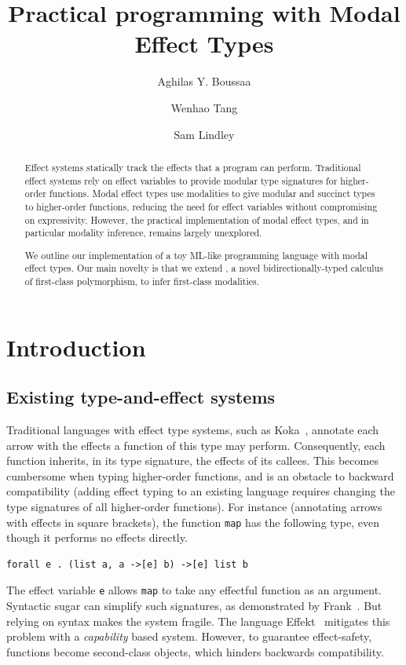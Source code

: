 \documentclass[sigplan, nonacm, natbib = false, review, screen]{acmart}
\title{Practical programming with Modal Effect Types}
\author{Aghilas Y. Boussaa}
\affiliation{
  \institution{École normale supérieure -- PSL}
  \country{France}
}
\author{Wenhao Tang}
\affiliation{%
  \institution{The University of Edinburgh}
  \country{UK}
}
\author{Sam Lindley}
\affiliation{%
  \institution{The University of Edinburgh}
  \country{UK}
}
\newcommand{\Frost}{\text{Frost}\xspace}
\begin{document}
\sloppy
\begin{abstract}
  Effect systems statically track the effects that a program can perform.
%
  Traditional effect systems rely on effect variables to provide modular type
  signatures for higher-order functions.
%
  Modal effect types use modalities to give modular and succinct types to
  higher-order functions, reducing the need for effect variables without
  compromising on expressivity.
%
  However, the practical implementation of modal effect types, and in particular
  modality inference, remains largely unexplored.

  We outline our implementation of a toy ML-like programming language with modal
  effect types.
%
  Our main novelty is that we extend \Frost, a novel bidirectionally-typed
  calculus of first-class polymorphism, to infer first-class modalities.
\end{abstract}
\maketitle
\section{Introduction}
\subsection{Existing type-and-effect systems}
Traditional languages with effect type systems, such as Koka~\cite{koka2014},
annotate each arrow with the effects a function of this type may
perform. Consequently, each function inherits, in its type signature, the
effects of its callees. This becomes cumbersome when typing higher-order
functions, and is an obstacle to backward compatibility (adding effect typing to
an existing language requires changing the type signatures of all higher-order
functions). For instance (annotating arrows with effects in square brackets),
the function \lstinline{map} has the following type, even though it performs no
effects directly.
\begin{lstlisting}[style=metl]
  forall e . (list a, a ->[e] b) ->[e] list b
\end{lstlisting}
The effect variable \lstinline{e} allows \lstinline{map} to take any effectful
function as an argument.
%
Syntactic sugar can simplify such signatures, as demonstrated by
Frank~\cite{frank2020}. But relying on syntax makes the system fragile.
%
The language Effekt~\cite{effekt2020} mitigates this problem with a
\emph{capability} based system. However, to guarantee effect-safety, functions
become second-class objects, which hinders backwards compatibility.
\end{document}
